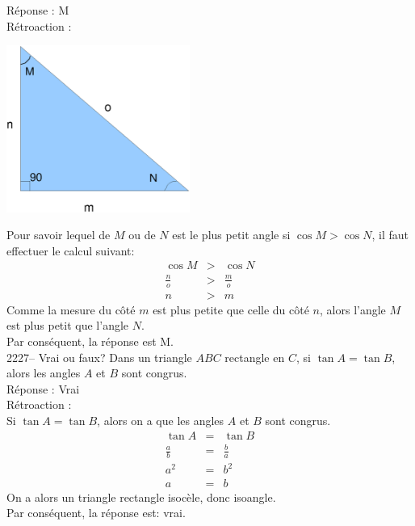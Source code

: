 \documentclass[letterpaper, 12pt]{article}
\begin{document}
R\'eponse : M\\

R\'etroaction :\\
\begin{center}
 \includegraphics[width=6cm,bb=14 14 583 529]{Triangle_rectangle3.eps}
\end{center}
Pour savoir lequel de $M$ ou de $N$ est le plus petit angle si $\cos{M}>\cos{N}$, il faut effectuer le calcul suivant:
\begin{eqnarray*}
 \cos{M}&>&\cos{N}\\[2mm]
\frac{n}{o}&>&\frac{m}{o}\\[2mm]
n&>&m
\end{eqnarray*}
Comme la mesure du c\^ot\'e $m$ est plus petite que celle du c\^ot\'e $n$, alors l'angle $M$ est plus petit que l'angle $N$.\\
Par cons\'equent, la r\'eponse est M.\\

2227-- Vrai ou faux? Dans un triangle $ABC$ rectangle en $C$, si $\tan{A}=\tan{B}$, alors les angles $A$ et $B$ sont congrus. \\

R\'eponse : Vrai\\

R\'etroaction :\\
Si $\tan{A}=\tan{B}$, alors on a que les angles $A$ et $B$ sont congrus.
\begin{eqnarray*}
 \tan{A}&=&\tan{B}\\[2mm]
\frac{a}{b}&=&\frac{b}{a}\\[2mm]
a^{2}&=&b^{2}\\[2mm]
a&=&b
\end{eqnarray*}
On a alors un triangle rectangle isoc\`ele, donc isoangle.\\
Par cons\'equent, la r\'eponse est: vrai.\\
\end{document}
